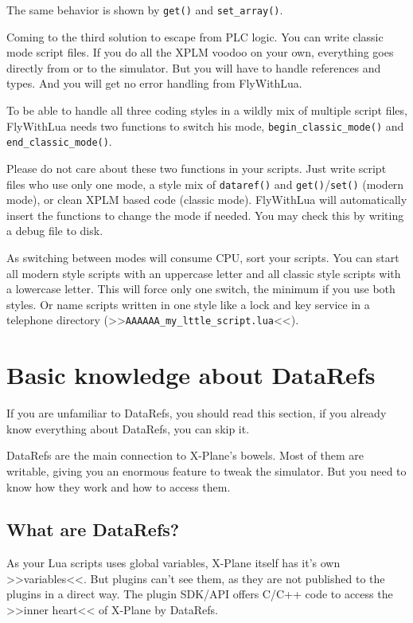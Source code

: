 \documentclass[11pt,parskip=half,a4paper]{scrartcl}
\begin{document}
The same behavior is shown by \verb|get()| and \verb|set_array()|.

Coming to the third solution to escape from PLC logic. You can write classic mode script files. If you do all the XPLM voodoo on your own, everything goes directly from or to the simulator. But you will have to handle references and types. And you will get no error handling from FlyWithLua.

To be able to handle all three coding styles in a wildly mix of multiple script files, FlyWithLua needs two functions to switch his mode, \verb|begin_classic_mode()| and \verb|end_classic_mode()|.

Please do not care about these two functions in your scripts. Just write script files who use only one mode, a style mix of \verb|dataref()| and \verb|get()|/\verb|set()| (modern mode), or clean XPLM based code (classic mode). FlyWithLua will automatically insert the functions to change the mode if needed. You may check this by writing a debug file to disk.

As switching between modes will consume CPU, sort your scripts. You can start all modern style scripts with an uppercase letter and all classic style scripts with a lowercase letter. This will force only one switch, the minimum if you use both styles. Or name scripts written in one style like a lock and key service in a telephone directory (>>\verb|AAAAAA_my_lttle_script.lua|<<).

\section{Basic knowledge about DataRefs}

If you are unfamiliar to DataRefs, you should read this section, if you already know everything about DataRefs, you can skip it.

DataRefs are the main connection to X-Plane's bowels. Most of them are writable, giving you an enormous feature to tweak the simulator. But you need to know how they work and how to access them.

\subsection{What are DataRefs?}

As your Lua scripts uses global variables, X-Plane itself has it's own >>variables<<. But plugins can't see them, as they are not published to the plugins in a direct way. The plugin SDK/API offers C/C++ code to access the >>inner heart<< of X-Plane by DataRefs.
\end{document}
